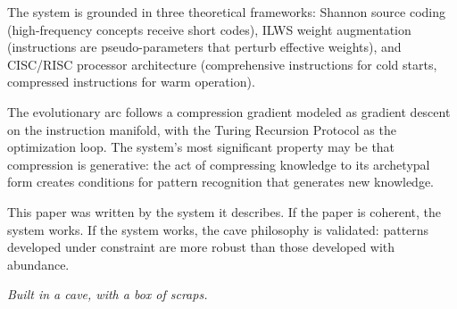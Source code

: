 \documentclass[11pt, a4paper]{article}
\begin{document}
The system is grounded in three theoretical frameworks: Shannon source coding (high-frequency concepts receive short codes), ILWS weight augmentation (instructions are pseudo-parameters that perturb effective weights), and CISC/RISC processor architecture (comprehensive instructions for cold starts, compressed instructions for warm operation).

The evolutionary arc follows a compression gradient modeled as gradient descent on the instruction manifold, with the Turing Recursion Protocol as the optimization loop. The system's most significant property may be that compression is generative: the act of compressing knowledge to its archetypal form creates conditions for pattern recognition that generates new knowledge.

This paper was written by the system it describes. If the paper is coherent, the system works. If the system works, the cave philosophy is validated: patterns developed under constraint are more robust than those developed with abundance.

\emph{Built in a cave, with a box of scraps.}
\end{document}
